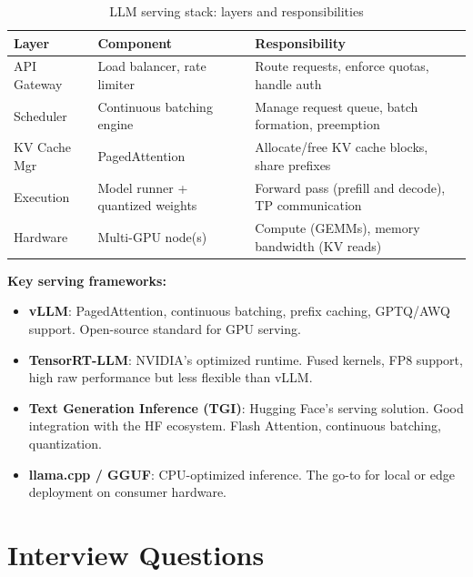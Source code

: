 \begin{table}[H]
\centering
\caption{LLM serving stack: layers and responsibilities}
\begin{tabularx}{\textwidth}{llX}
\toprule
\textbf{Layer} & \textbf{Component} & \textbf{Responsibility} \\
\midrule
API Gateway & Load balancer, rate limiter & Route requests, enforce quotas, handle auth \\
Scheduler & Continuous batching engine & Manage request queue, batch formation, preemption \\
KV Cache Mgr & PagedAttention & Allocate/free KV cache blocks, share prefixes \\
Execution & Model runner + quantized weights & Forward pass (prefill and decode), TP communication \\
Hardware & Multi-GPU node(s) & Compute (GEMMs), memory bandwidth (KV reads) \\
\bottomrule
\end{tabularx}
\end{table}

\textbf{Key serving frameworks:}
\begin{itemize}
    \item \textbf{vLLM}: PagedAttention, continuous batching, prefix caching, GPTQ/AWQ support. Open-source standard for GPU serving.
    \item \textbf{TensorRT-LLM}: NVIDIA's optimized runtime. Fused kernels, FP8 support, high raw performance but less flexible than vLLM.
    \item \textbf{Text Generation Inference (TGI)}: Hugging Face's serving solution. Good integration with the HF ecosystem. Flash Attention, continuous batching, quantization.
    \item \textbf{llama.cpp / GGUF}: CPU-optimized inference. The go-to for local or edge deployment on consumer hardware.
\end{itemize}

\section{Interview Questions}
\label{sec:inference_interview}


